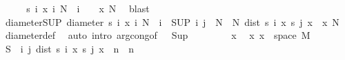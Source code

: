 \begin{isabellebody}
%
\isadelimproof
%
\endisadelimproof
%
\isatagproof
{}\isamarkupfalse%
\ {\isacharminus}{\kern0pt}\isanewline
\ \ \isamarkupfalse%
\ {\isachardoublequoteopen}{\isacharbraceleft}{\kern0pt}s\ i\ x\ {\isacharbar}{\kern0pt}i{\isachardot}{\kern0pt}\ N\ {\isasymle}\ i{\isacharbraceright}{\kern0pt}\ {\isasymnoteq}\ {\isacharbraceleft}{\kern0pt}{\isacharbraceright}{\kern0pt}{\isachardoublequoteclose}\ \ x\ N\ \isamarkupfalse%
\ blast\isanewline
\ \ \isamarkupfalse%
\ diameter{\isacharunderscore}{\kern0pt}SUP{\isacharcolon}{\kern0pt}\ {\isachardoublequoteopen}diameter\ {\isacharbraceleft}{\kern0pt}s\ i\ x\ {\isacharbar}{\kern0pt}i{\isachardot}{\kern0pt}\ N\ {\isasymle}\ i{\isacharbraceright}{\kern0pt}\ {\isacharequal}{\kern0pt}\ {\isacharparenleft}{\kern0pt}SUP\ {\isacharparenleft}{\kern0pt}i{\isacharcomma}{\kern0pt}\ j{\isacharparenright}{\kern0pt}\ {\isasymin}\ {\isacharbraceleft}{\kern0pt}N{\isachardot}{\kern0pt}{\isachardot}{\kern0pt}{\isacharbraceright}{\kern0pt}\ {\isasymtimes}\ {\isacharbraceleft}{\kern0pt}N{\isachardot}{\kern0pt}{\isachardot}{\kern0pt}{\isacharbraceright}{\kern0pt}{\isachardot}{\kern0pt}\ dist\ {\isacharparenleft}{\kern0pt}s\ i\ x{\isacharparenright}{\kern0pt}\ {\isacharparenleft}{\kern0pt}s\ j\ x{\isacharparenright}{\kern0pt}{\isacharparenright}{\kern0pt}{\isachardoublequoteclose}\ \ x\ N\ \isamarkupfalse%
\ diameter{\isacharunderscore}{\kern0pt}def\ \isamarkupfalse%
\ {\isacharparenleft}{\kern0pt}auto\ intro{\isacharbang}{\kern0pt}{\isacharcolon}{\kern0pt}\ arg{\isacharunderscore}{\kern0pt}cong{\isacharbrackleft}{\kern0pt}of\ {\isacharunderscore}{\kern0pt}\ {\isacharunderscore}{\kern0pt}\ Sup{\isacharbrackright}{\kern0pt}{\isacharparenright}{\kern0pt}\isanewline
\ \ \isacommand{{\isacharbraceleft}{\kern0pt}}\isamarkupfalse%
\isanewline
\ \ \ \ \isamarkupfalse%
\ x\ \isamarkupfalse%
\ x{\isacharcolon}{\kern0pt}\ {\isachardoublequoteopen}x\ {\isasymin}\ space\ M{\isachardoublequoteclose}\isanewline
\ \ \ \ \isamarkupfalse%
\ {\isacharquery}{\kern0pt}S\ {\isacharequal}{\kern0pt}\ {\isachardoublequoteopen}{\isacharparenleft}{\kern0pt}{\isasymlambda}{\isacharparenleft}{\kern0pt}i{\isacharcomma}{\kern0pt}\ j{\isacharparenright}{\kern0pt}{\isachardot}{\kern0pt}\ dist\ {\isacharparenleft}{\kern0pt}s\ i\ x{\isacharparenright}{\kern0pt}\ {\isacharparenleft}{\kern0pt}s\ j\ x{\isacharparenright}{\kern0pt}{\isacharparenright}{\kern0pt}\ {\isacharbackquote}{\kern0pt}\ {\isacharparenleft}{\kern0pt}{\isacharbraceleft}{\kern0pt}n{\isachardot}{\kern0pt}{\isachardot}{\kern0pt}{\isacharbraceright}{\kern0pt}\ {\isasymtimes}\ {\isacharbraceleft}{\kern0pt}n{\isachardot}{\kern0pt}{\isachardot}{\kern0pt}{\isacharbraceright}{\kern0pt}{\isacharparenright}{\kern0pt}{\isachardoublequoteclose}\isanewline

\end{isabellebody}
